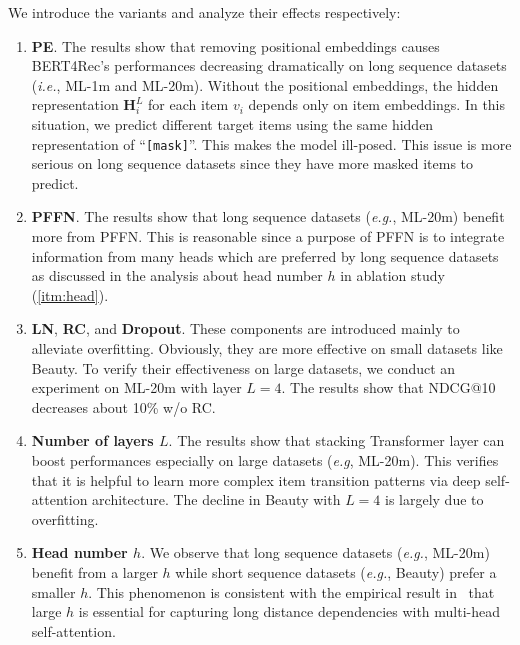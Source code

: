We introduce the variants and analyze their effects respectively:
\begin{enumerate}%
  \item \textbf{PE}. The results show that removing positional embeddings causes BERT4Rec's performances decreasing dramatically on long sequence datasets (\textit{i.e.}, ML-1m and ML-20m). Without the positional embeddings, the hidden representation $\bm{H}_i^L$ for each item $v_i$ depends only on item embeddings.
  In this situation, we predict different target items using the same hidden representation of ``\texttt{[mask]}''. This makes the model ill-posed. This issue is more serious on long sequence datasets since they have more masked items to predict.
  \item \textbf{PFFN}. The results show that long sequence datasets (\textit{e.g.}, ML-20m) benefit more from PFFN. 
  This is reasonable since a purpose of PFFN is to integrate information from many heads which are preferred by long sequence datasets as discussed in the analysis about head number $h$ in ablation study (\ref{itm:head}). %
  \item \textbf{LN}, \textbf{RC}, and \textbf{Dropout}. These components are introduced mainly to alleviate overfitting. 
  Obviously, they are more effective on small datasets like Beauty.
   To verify their effectiveness on large datasets, we conduct an experiment on ML-20m with layer $L{=}4$.
   The results show that NDCG@10 decreases about 10\% w/o RC.
  \item \textbf{Number of layers $L$}. The results show that stacking Transformer layer can boost performances especially on large datasets (\textit{e.g}, ML-20m).
  This verifies that it is helpful to learn more complex item transition patterns via deep self-attention architecture.
  The decline in Beauty with $L=4$ is largely due to overfitting.
  \item\label{itm:head} \textbf{Head number $h$}. We observe that long sequence datasets (\textit{e.g.}, ML-20m) benefit from a larger $h$ while short sequence datasets (\textit{e.g.}, Beauty) prefer a smaller $h$. This phenomenon is consistent with the empirical result in~\cite{Tang:EMNLP2018:Why} that large $h$ is essential for capturing long distance dependencies with multi-head self-attention.
\end{enumerate}
